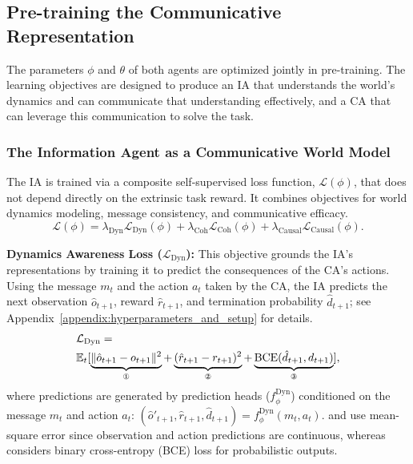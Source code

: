 \documentclass[letterpaper]{article} %
\begin{document}
\subsection{Pre-training the Communicative Representation}
The parameters $\phi$ and $\theta$ of both agents are optimized jointly in pre-training. The learning objectives are designed to produce an IA that understands the world's dynamics and can communicate that understanding effectively, and a CA that can leverage this communication to solve the task.

\subsubsection{The Information Agent as a Communicative World Model}

The IA is trained via a composite self-supervised loss function, $\mathcal{L}(\phi)$, that does not depend directly on the extrinsic task reward. It combines objectives for world dynamics modeling, message consistency, and communicative efficacy.
\begin{equation*}
    \mathcal{L}(\phi) = \lambda_{\text{Dyn}} \mathcal{L}_{\text{Dyn}}(\phi) + \lambda_{\text{Coh}} \mathcal{L}_{\text{Coh}}(\phi) + \lambda_{\text{Causal}} \mathcal{L}_{\text{Causal}}(\phi).
\end{equation*}

\textbf{Dynamics Awareness Loss ($\mathcal{L}_{\text{Dyn}}$):} This objective grounds the IA's representations by training it to predict the consequences of the CA's actions. Using the message $m_t$ and the action $a_t$ taken by the CA, the IA predicts the next observation $\hat{o}_{t+1}$, reward $\hat{r}_{t+1}$, and termination probability $\hat{d}_{t+1}$; see Appendix~\ref{appendix:hyperparameters_and_setup} for details. 
\begin{align*}
    &\mathcal{L}_{\text{Dyn}}=\\
&\mathbb{E}_t [  \underbrace{\| \hat{o}_{t+1} - o_{t+1} \|^2}_{\text{\ding{172}}} + \underbrace{(\hat{r}_{t+1} - r_{t+1})^2}_{\text{\ding{173}}}   +  \underbrace{\text{BCE}(\hat{d}_{t+1}, d_{t+1})}_{\text{\ding{174}}}], 
\end{align*}
where predictions are generated by prediction heads ($f_{\phi}^{\text{Dyn}}$) conditioned on the message $m_t$ and action $a_t$: $(\hat{o}'_{t+1}, \hat{r}_{t+1}, \hat{d}_{t+1}) = f_{\phi}^{\text{Dyn}}(m_t, a_t)$.  and  use mean-square error since observation and action predictions are continuous, whereas  considers binary cross-entropy (BCE) loss for probabilistic outputs.
\end{document}
